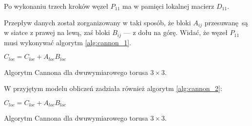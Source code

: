 \noindent Po wykonaniu trzech kroków węzeł \(P_{11}\) ma w pamięci lokalnej macierz \(D_{11}\).

Przepływ danych został zorganizowany w taki sposób, że bloki \(A_{ij}\) przesuwanę są w siatce z prawej na lewą, zaś bloki \(B_{ij}\) --- z dołu na górę. Widać, że węzeł \(P_{11}\) musi wykonywać algorytm \ref{alg:cannon_1}.

\begin{algorithm}[H]
\centering
\begin{algorithmic}[1]
\State \(C_{loc} = C_{loc} + A_{loc}B_{loc}\)
\EndFor
\end{algorithmic}
\caption{Algorytm Cannona dla dwuwymiarowego torusa \(3\times 3\).}
\label{alg:cannon_1}
\end{algorithm}

\noindent W przyjętym modelu obliczeń zadziała również algorytm \ref{alg:cannon_2}:

\begin{algorithm}[H]
\centering
\begin{algorithmic}[1]
\State \(C_{loc} = C_{loc} + A_{loc}B_{loc}\)
\EndFor
\end{algorithmic}
\caption{Algorytm Cannona dla dwuwymiarowego torusa \(3\times 3\).}
\label{alg:cannon_2}
\end{algorithm}

